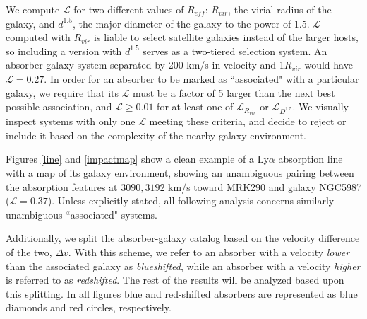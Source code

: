 \documentclass[iop]{emulateapj-rtx4}
\begin{document}
We compute $\mathcal{L}$ for two different values of $R_{eff}$: $R_{vir}$, the virial radius of the galaxy, and $d^{1.5}$, the major diameter of the galaxy to the power of 1.5. $\mathcal{L}$ computed with $R_{vir}$ is liable to select satellite galaxies instead of the larger hosts, so including a version with $d^{1.5}$ serves as a two-tiered selection system. An absorber-galaxy system separated by 200 km/s in velocity and 1$R_{vir}$ would have $\mathcal{L} = 0.27$. In order for an absorber to be marked as ``associated" with a particular galaxy, we require that its $\mathcal{L}$ must be a factor of 5 larger than the next best possible association, and $\mathcal{L} \ge 0.01$ for at least one of $\mathcal{L}_{R_{vir}}$ or $\mathcal{L}_{D^{1.5}}$. We visually inspect systems with only one $\mathcal{L}$ meeting these criteria, and decide to reject or include it based on the complexity of the nearby galaxy environment. 

Figures \ref{line} and \ref{impactmap} show a clean example of a Ly$\alpha$ absorption line with a map of its galaxy environment, showing an unambiguous pairing between the absorption features at $3090, 3192$ km/s toward MRK290 and galaxy NGC5987 ($\mathcal{L} = 0.37$). Unless explicitly stated, all following analysis concerns similarly unambiguous ``associated" systems. 

Additionally, we split the absorber-galaxy catalog based on the velocity difference of the two, $\Delta v$. With this scheme, we refer to an absorber with a velocity \textit{lower} than the associated galaxy as \textit{blueshifted}, while an absorber with a velocity \textit{higher} is referred to as \textit{redshifted}. The rest of the results will be analyzed based upon this splitting. In all figures blue and red-shifted absorbers are represented as blue diamonds and red circles, respectively.
\end{document}
